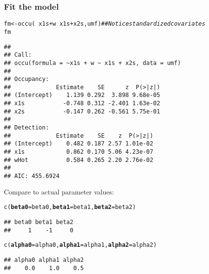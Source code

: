 \documentclass[color=usenames,dvipsnames]{beamer}\usepackage[]{graphicx}\usepackage[]{color}
\makeatletter
\newcommand{\hlcom}[1]{\textcolor[rgb]{0.514,0.506,0.514}{\textit{#1}}}%
\newcommand{\hlopt}[1]{\textcolor[rgb]{0,0,0}{#1}}%
\newcommand{\hlstd}[1]{\textcolor[rgb]{0,0,0}{#1}}%
\newcommand{\hlkwb}[1]{\textcolor[rgb]{0,0.341,0.682}{#1}}%
\newcommand{\hlkwc}[1]{\textcolor[rgb]{0,0,0}{\textbf{#1}}}%
\newcommand{\hlkwd}[1]{\textcolor[rgb]{0.004,0.004,0.506}{#1}}%
\newenvironment{kframe}{%
 \def\at@end@of@kframe{}%
 \ifinner\ifhmode%
  \def\at@end@of@kframe{\end{minipage}}%
  \begin{minipage}{\columnwidth}%
 \fi\fi%
 \def\FrameCommand##1{\hskip\@totalleftmargin \hskip-\fboxsep
 \colorbox{shadecolor}{##1}\hskip-\fboxsep
     \hskip-\linewidth \hskip-\@totalleftmargin \hskip\columnwidth}%
 \MakeFramed {\advance\hsize-\width
   \@totalleftmargin\z@ \linewidth\hsize
   \@setminipage}}%
 {\par\unskip\endMakeFramed%
 \at@end@of@kframe}
\newenvironment{knitrout}{}{} %
\makeatother
\begin{document}
\begin{frame}[fragile]
  \frametitle{Fit the model}
  \footnotesize
\begin{knitrout}\tiny
{}\color{fgcolor}\begin{kframe}
\begin{alltt}
\hlstd{fm} \hlkwb{<-} \hlkwd{occu}\hlstd{(}\hlopt{~}\hlstd{x1s}\hlopt{+}\hlstd{w} \hlopt{~}\hlstd{x1s}\hlopt{+}\hlstd{x2s, umf)}    \hlcom{## Notice standardized covariates}
\hlstd{fm}
\end{alltt}
\begin{verbatim}
## 
## Call:
## occu(formula = ~x1s + w ~ x1s + x2s, data = umf)
## 
## Occupancy:
##             Estimate    SE      z  P(>|z|)
## (Intercept)    1.139 0.292  3.898 9.68e-05
## x1s           -0.748 0.312 -2.401 1.63e-02
## x2s           -0.147 0.262 -0.561 5.75e-01
## 
## Detection:
##             Estimate    SE    z  P(>|z|)
## (Intercept)    0.482 0.187 2.57 1.01e-02
## x1s            0.862 0.170 5.06 4.23e-07
## wHot           0.584 0.265 2.20 2.76e-02
## 
## AIC: 455.6924
\end{verbatim}
\end{kframe}
\end{knitrout}
\pause
\vfill
Compare to actual parameter values:
\begin{knitrout}\tiny
{}\color{fgcolor}\begin{kframe}
\begin{alltt}
\hlkwd{c}\hlstd{(}\hlkwc{beta0}\hlstd{=beta0,} \hlkwc{beta1}\hlstd{=beta1,} \hlkwc{beta2}\hlstd{=beta2)}
\end{alltt}
\begin{verbatim}
## beta0 beta1 beta2 
##     1    -1     0
\end{verbatim}
\begin{alltt}
\hlkwd{c}\hlstd{(}\hlkwc{alpha0}\hlstd{=alpha0,} \hlkwc{alpha1}\hlstd{=alpha1,} \hlkwc{alpha2}\hlstd{=alpha2)}
\end{alltt}
\begin{verbatim}
## alpha0 alpha1 alpha2 
##    0.0    1.0    0.5
\end{verbatim}
\end{kframe}
\end{knitrout}
\end{frame}
\end{document}
